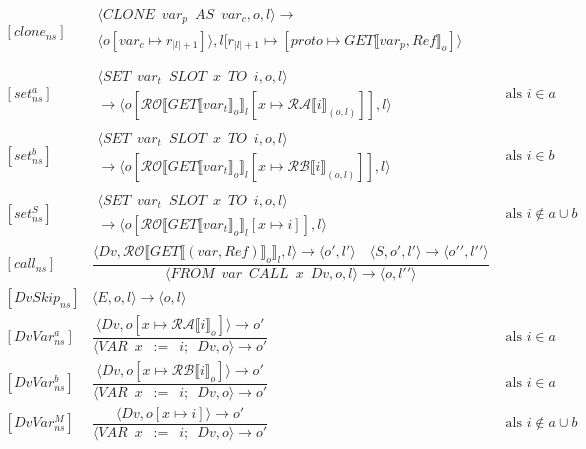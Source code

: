 \documentclass[12pt]{article}
\newcommand{\RA}{\mathcal{RA}}
\newcommand{\RB}{\mathcal{RB}}
\newcommand{\RO}{\mathcal{RO}}
\begin{document}
\[
\begin{matrix}
[clone_{ns}] &
\begin{matrix}
\langle CLONE \enspace var_p \enspace AS \enspace var_c, o, l\rangle 
\rightarrow\\
\langle o[var_c \mapsto r_{|l|+1}] \rangle, l[ r_{|l|+1} \mapsto [ proto \mapsto GET \llbracket var_p, Ref \rrbracket_o ] \rangle \\
\end{matrix}\\
[set_{ns}^{a}] &
\begin{matrix}
\langle SET \enspace var_t \enspace SLOT \enspace x \enspace TO \enspace i, o, l \rangle\\
\rightarrow
\langle o[ \RO \llbracket GET \llbracket var_t \rrbracket_o \rrbracket_l[x \mapsto \RA 
\llbracket i \rrbracket_{(o,l)} ] ], l \rangle
\end{matrix}
& \mbox{ als } i \in a \\
[set_{ns}^{b}] &
\begin{matrix}
\langle SET \enspace var_t \enspace SLOT \enspace x \enspace TO \enspace i, o, l \rangle\\
\rightarrow
\langle o[ \RO \llbracket GET \llbracket var_t \rrbracket_o \rrbracket_l[x \mapsto \RB 
\llbracket i \rrbracket_{(o,l)} ] ], l \rangle
\end{matrix}
& \mbox{ als } i \in b \\
[set_{ns}^{S}] &
\begin{matrix}
\langle SET \enspace var_t \enspace SLOT \enspace x \enspace TO \enspace i, o, l \rangle\\
\rightarrow
\langle o[ \RO \llbracket GET \llbracket var_t \rrbracket_o \rrbracket_l [x \mapsto i ] ], l \rangle
\end{matrix}
& \mbox{ als } i \not\in a \cup b \\
[call_{ns}] &
\dfrac
{
	\langle Dv, \RO \llbracket GET\llbracket (var, Ref) \rrbracket_o \rrbracket_l, l \rangle \rightarrow \langle o\prime, l\prime \rangle
	\quad
	\langle S, o\prime, l\prime \rangle
	\rightarrow
	\langle o\prime\prime, l\prime\prime \rangle
}
{
	\langle FROM \enspace var \enspace CALL \enspace x \enspace Dv,o,l \rangle
	\rightarrow
	\langle o, l\prime\prime \rangle
}\\
[DvSkip_{ns}] &
\langle E,o,l \rangle \rightarrow \langle o,l \rangle \\
[DvVar_{ns}^{a}] &
\dfrac
{	\langle Dv,o[x \mapsto \RA \llbracket i \rrbracket_o] \rangle \rightarrow o\prime }
{
	\langle VAR \enspace x \enspace := \enspace i; \enspace Dv, o \rangle
	\rightarrow
	o\prime
} &
\mbox{ als } i \in a \\
[DvVar_{ns}^{b}] &
\dfrac
{	\langle Dv,o[x \mapsto \RB \llbracket i \rrbracket_o] \rangle \rightarrow  o\prime }
{
	\langle VAR \enspace x \enspace := \enspace i; \enspace Dv, o \rangle
	\rightarrow
	o\prime
} &
\mbox{ als } i \in a \\
[DvVar_{ns}^{M}] &
\dfrac
{	\langle Dv,o[x \mapsto i] \rangle \rightarrow o\prime }
{
	\langle VAR \enspace x \enspace := \enspace i; \enspace Dv, o \rangle
	\rightarrow
	o\prime
} &
\mbox{ als } i \not\in a \cup b \\

\end{matrix}
\]
\end{document}
